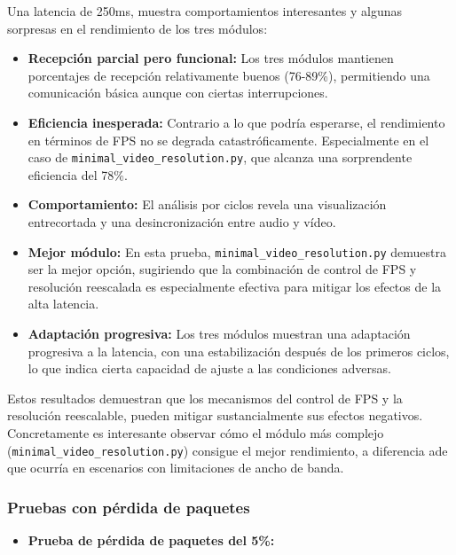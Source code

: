 Una latencia de 250ms, muestra comportamientos interesantes y algunas sorpresas en el rendimiento de los tres módulos:

\begin{itemize}
    \item \textbf{Recepción parcial pero funcional:} Los tres módulos mantienen porcentajes de recepción relativamente buenos (76-89\%), permitiendo una comunicación básica aunque con ciertas interrupciones.
    
    \item \textbf{Eficiencia inesperada:} Contrario a lo que podría esperarse, el rendimiento en términos de FPS no se degrada catastróficamente. Especialmente en el caso de \texttt{minimal\_video\_resolution.py}, que alcanza una sorprendente eficiencia del 78\%.
    
    \item \textbf{Comportamiento:} El análisis por ciclos revela una visualización entrecortada y una desincronización entre audio y vídeo.
    
    \item \textbf{Mejor módulo:} En esta prueba, \texttt{minimal\_video\_resolution.py} demuestra ser la mejor opción, sugiriendo que la combinación de control de FPS y resolución reescalada es especialmente efectiva para mitigar los efectos de la alta latencia.
    
    \item \textbf{Adaptación progresiva:} Los tres módulos muestran una adaptación progresiva a la latencia, con una estabilización después de los primeros ciclos, lo que indica cierta capacidad de ajuste a las condiciones adversas.
\end{itemize}

Estos resultados demuestran que los mecanismos del control de FPS y la resolución reescalable, pueden mitigar sustancialmente sus efectos negativos. Concretamente es interesante observar cómo el módulo más complejo (\texttt{minimal\_video\_resolution.py}) consigue el mejor rendimiento, a diferencia ade que ocurría en escenarios con limitaciones de ancho de banda.

\newpage


\subsubsection{Pruebas con pérdida de paquetes}

\begin{itemize}
  \item \textbf{Prueba de pérdida de paquetes del 5\%:}
\end{itemize}

